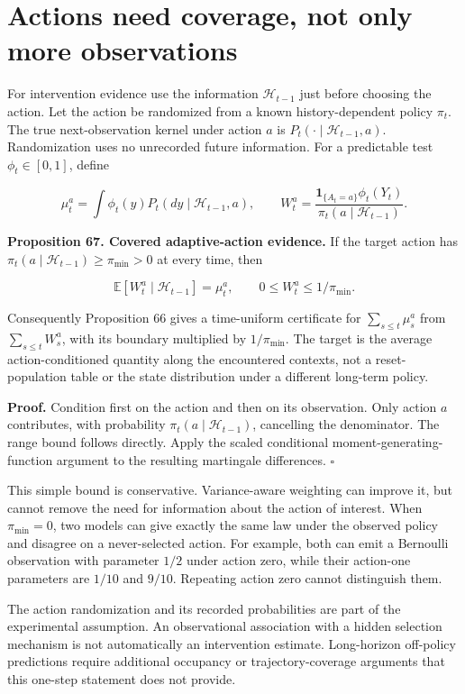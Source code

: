 \section{Actions need coverage, not only more observations}\label{LSM:actions-need-coverage-not-only-more-observations}

For intervention evidence use the information \(\mathcal H_{t-1}\) just
before choosing the action. Let the action be randomized from a known
history-dependent policy \(\pi_t\). The true next-observation kernel
under action \(a\) is \(P_t(\cdot\mid\mathcal H_{t-1},a)\).
Randomization uses no unrecorded future information. For a predictable
test \(\phi_t\in[0,1]\), define

\[
\mu_t^a=\int\phi_t(y)P_t(dy\mid\mathcal H_{t-1},a),\qquad
W_t^a=\frac{\mathbf1_{\{A_t=a\}}\phi_t(Y_t)}{\pi_t(a\mid\mathcal H_{t-1})}.
\]

\textbf{Proposition 67. Covered adaptive-action evidence.} If the target
action has \(\pi_t(a\mid\mathcal H_{t-1})\geq\pi_{\min}>0\) at every
time, then

\[
\mathbb E[W_t^a\mid\mathcal H_{t-1}]=\mu_t^a,
\qquad 0\leq W_t^a\leq1/\pi_{\min}.
\]

Consequently Proposition 66 gives a time-uniform certificate for
\(\sum_{s\leq t}\mu_s^a\) from \(\sum_{s\leq t}W_s^a\), with its
boundary multiplied by \(1/\pi_{\min}\). The target is the average
action-conditioned quantity along the encountered contexts, not a
reset-population table or the state distribution under a different
long-term policy.

\textbf{Proof.} Condition first on the action and then on its
observation. Only action \(a\) contributes, with probability
\(\pi_t(a\mid\mathcal H_{t-1})\), cancelling the denominator. The range
bound follows directly. Apply the scaled conditional
moment-generating-function argument to the resulting martingale
differences. \(\square\)

This simple bound is conservative. Variance-aware weighting can improve
it, but cannot remove the need for information about the action of
interest. When \(\pi_{\min}=0\), two models can give exactly the same
law under the observed policy and disagree on a never-selected action.
For example, both can emit a Bernoulli observation with parameter
\(1/2\) under action zero, while their action-one parameters are
\(1/10\) and \(9/10\). Repeating action zero cannot distinguish them.

The action randomization and its recorded probabilities are part of the
experimental assumption. An observational association with a hidden
selection mechanism is not automatically an intervention estimate.
Long-horizon off-policy predictions require additional occupancy or
trajectory-coverage arguments that this one-step statement does not
provide.

